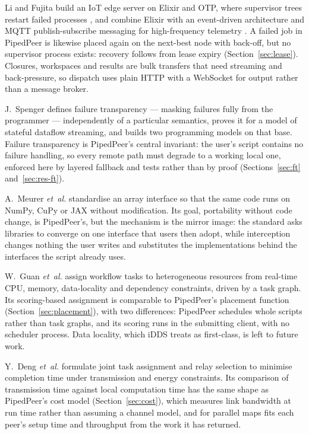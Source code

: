 Li and Fujita build an IoT edge server on Elixir and OTP, where supervisor trees
restart failed processes \cite{li2023elixir}, and combine Elixir with an
event-driven architecture and MQTT publish-subscribe messaging for
high-frequency telemetry \cite{zhou2024}. A failed job in PipedPeer is likewise
placed again on the next-best node with back-off, but no supervisor process
exists: recovery follows from lease expiry (Section~\ref{sec:lease}). Closures,
workspaces and results are bulk transfers that need streaming and
back-pressure, so dispatch uses plain HTTP with a WebSocket for output rather
than a message broker.

J.~Spenger \cite{kth2025thesis} defines failure transparency --- masking
failures fully from the programmer --- independently of a particular semantics,
proves it for a model of stateful dataflow streaming, and builds two programming
models on that base. Failure transparency is PipedPeer's central invariant: the
user's script contains no failure handling, so every remote path must degrade to
a working local one, enforced here by layered fallback and tests rather than by
proof (Sections~\ref{sec:ft} and~\ref{sec:res-ft}).

A.~Meurer \textit{et~al.} \cite{arrayapi2023} standardise an array interface so that the same code runs on NumPy, CuPy or JAX
without modification. Its goal, portability without code change, is
PipedPeer's, but the mechanism is the mirror image: the standard asks libraries
to converge on one interface that users then adopt, while interception changes
nothing the user writes and substitutes the implementations behind the
interfaces the script already uses.

W.~Guan \textit{et~al.} \cite{idds2025} assign workflow tasks to heterogeneous resources from
real-time CPU, memory, data-locality and dependency constraints, driven by a
task graph. Its scoring-based assignment is comparable to PipedPeer's placement
function (Section~\ref{sec:placement}), with two differences: PipedPeer schedules
whole scripts rather than task graphs, and its scoring runs in the submitting
client, with no scheduler process. Data locality, which iDDS treats as
first-class, is left to future work.

Y.~Deng \textit{et~al.} \cite{deng2023} formulate joint task assignment and
relay selection to minimise completion time under transmission and energy
constraints. Its comparison of transmission time against local computation time
has the same shape as PipedPeer's cost model (Section~\ref{sec:cost}), which
measures link bandwidth at run time rather than assuming a channel model, and
for parallel maps fits each peer's setup time and throughput from the work it
has returned.

